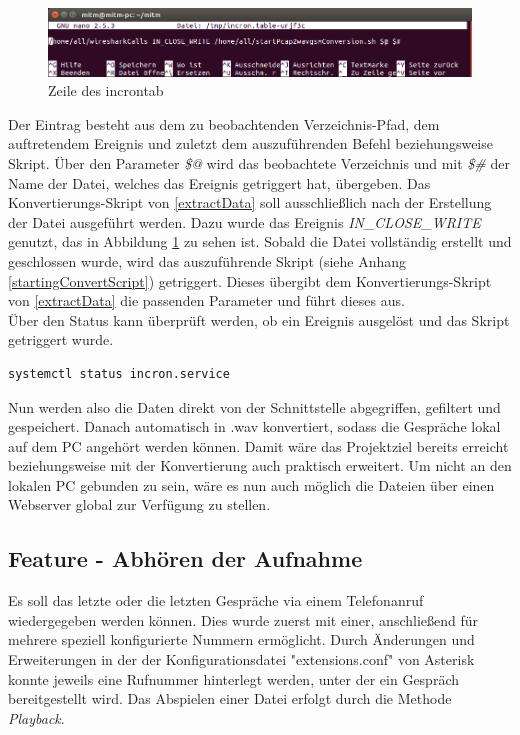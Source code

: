 \begin{figure}[h] %
\centering
\includegraphics[width=15cm]{includes/incrontab}
\caption{Zeile des incrontab}
\label{fig:incrontab}
\end{figure}


Der Eintrag besteht aus dem zu beobachtenden Verzeichnis-Pfad, dem auftretendem Ereignis und zuletzt dem auszuführenden Befehl beziehungsweise Skript. Über den Parameter \textit{\$@}  wird das beobachtete Verzeichnis und mit \textit{\$\#} der Name der Datei, welches das Ereignis getriggert hat, übergeben. Das Konvertierungs-Skript von \ref{extractData} soll ausschließlich nach der Erstellung der Datei ausgeführt werden. Dazu wurde das Ereignis \textit{IN\_CLOSE\_WRITE} genutzt, das in Abbildung \ref{fig:incrontab} zu sehen ist. Sobald die Datei vollständig erstellt und geschlossen wurde, wird das auszuführende Skript (siehe Anhang \ref{startingConvertScript}) getriggert. Dieses übergibt dem Konvertierungs-Skript von \ref{extractData} die passenden Parameter und führt dieses aus.\\

Über den Status kann überprüft werden, ob ein Ereignis ausgelöst und das Skript getriggert wurde.

\begin{lstlisting}
systemctl status incron.service
\end{lstlisting}


Nun werden also die Daten direkt von der Schnittstelle abgegriffen, gefiltert und gespeichert. Danach automatisch in .wav konvertiert, sodass die Gespräche lokal auf dem PC angehört werden können. Damit wäre das Projektziel bereits erreicht beziehungsweise mit der Konvertierung auch praktisch erweitert. Um nicht an den lokalen PC gebunden zu sein, wäre es nun auch möglich die Dateien über einen Webserver global zur Verfügung zu stellen.


\subsection{Feature - Abhören der Aufnahme}
Es soll das letzte oder die letzten Gespräche via einem Telefonanruf wiedergegeben werden können. Dies wurde zuerst mit einer, anschließend für mehrere speziell konfigurierte Nummern ermöglicht. 
Durch Änderungen und Erweiterungen in der der Konfigurationsdatei "extensions.conf" von Asterisk konnte jeweils eine Rufnummer hinterlegt werden, unter der ein Gespräch bereitgestellt wird. Das Abspielen einer Datei erfolgt durch die Methode \textit{Playback}.\\

